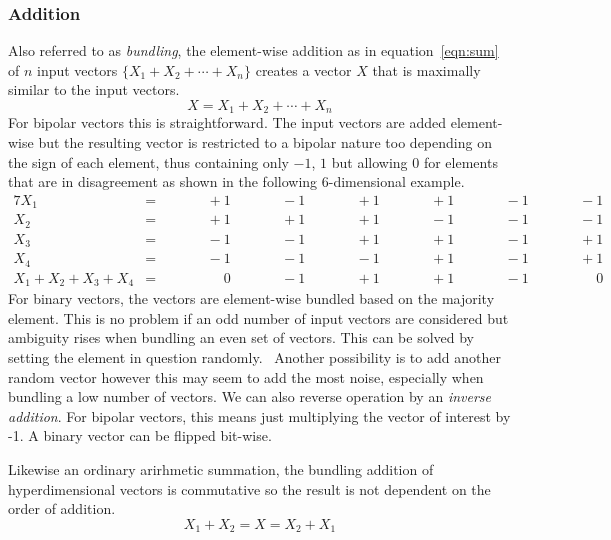 \subsubsection{Addition} \label{sssec:add}
Also referred to as \textit{bundling}, the element-wise addition as in equation~\ref{eqn:sum} of $n$ input vectors $\{X_{1} + X_{2} + \cdots + X_{n}\}$ creates a vector $X$ that is maximally similar to the input vectors.
\begin{equation}
    \label{eqn:sum}
    X = X_{1} + X_{2} + \cdots + X_{n}
\end{equation}
For bipolar vectors this is straightforward. The input vectors are added element-wise but the resulting vector is restricted to a bipolar nature too depending on the sign of each element, thus containing only $-1$, $1$ but allowing $0$ for elements that are in disagreement as shown in the following $6$-dimensional example.
\begin{alignat*}{7}
    X_{1} &= && \qquad +1 && \qquad -1 && \qquad +1 && \qquad +1 && \qquad -1 && \qquad -1 \\
    X_{2} &= && \qquad +1 && \qquad +1 && \qquad +1 && \qquad -1 && \qquad -1 && \qquad -1 \\
    X_{3} &= && \qquad -1 && \qquad -1 && \qquad +1 && \qquad +1 && \qquad -1 && \qquad +1 \\
    X_{4} &= && \qquad -1 && \qquad -1 && \qquad -1 && \qquad +1 && \qquad -1 && \qquad +1 \\
    \hline
    X_{1} + X_{2} + X_{3} + X_{4} &= && \qquad \phantom{-}0 && \qquad -1 && \qquad +1 && \qquad +1 && \qquad -1 && \qquad \phantom{-}0
\end{alignat*}
For binary vectors, the vectors are element-wise bundled based on the majority element. This is no problem if an odd number of input vectors are considered but ambiguity rises when bundling an even set of vectors. This can be solved by setting the element in question randomly.~\cite{binBund} Another possibility is to add another random vector however this may seem to add the most noise, especially when bundling a low number of vectors. We can also reverse operation by an \textit{inverse addition}. For bipolar vectors, this means just multiplying the vector of interest by -1. A binary vector can be flipped bit-wise.

Likewise an ordinary arirhmetic summation, the bundling addition of hyperdimensional vectors is commutative so the result is not dependent on the order of addition.
\begin{equation}
    \label{eqn:sumcom}
    X_{1} + X_{2} = X = X_{2} + X_{1}
\end{equation}
